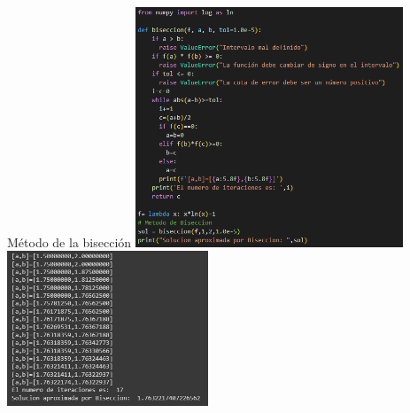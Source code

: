 \begin{frame}{Método de la bisección}
         \includegraphics[width=8cm]{p10-codigo-biseccion.png}
        \includegraphics[width=6cm]{p10-ejecucion-biseccion.png}
\end{frame}

